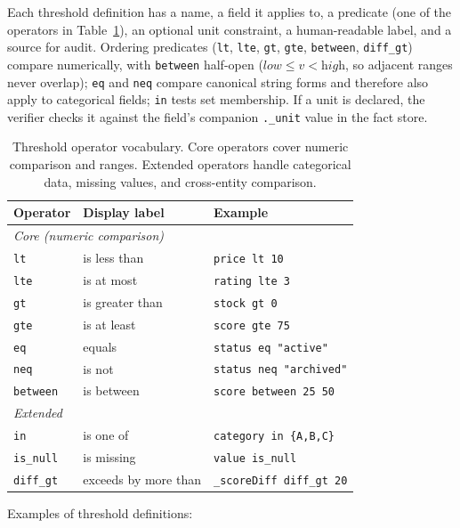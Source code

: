 \documentclass[11pt,a4paper]{article}
\begin{document}
Each threshold definition has a name, a field it applies to, a predicate (one of the operators in Table~\ref{tab:operators}), an optional unit constraint, a human-readable label, and a source for audit. Ordering predicates (\texttt{lt}, \texttt{lte}, \texttt{gt}, \texttt{gte}, \texttt{between}, \texttt{diff\_gt}) compare numerically, with \texttt{between} half-open ($\textit{low} \leq v < \textit{high}$, so adjacent ranges never overlap); \texttt{eq} and \texttt{neq} compare canonical string forms and therefore also apply to categorical fields; \texttt{in} tests set membership. If a unit is declared, the verifier checks it against the field's companion \texttt{.\_unit} value in the fact store.

\begin{table}[h]
\centering
\small
\begin{tabular}{lll}
\toprule
\textbf{Operator} & \textbf{Display label} & \textbf{Example} \\
\midrule
\multicolumn{3}{l}{\textit{Core (numeric comparison)}} \\
\texttt{lt} & is less than & \texttt{price lt 10} \\
\texttt{lte} & is at most & \texttt{rating lte 3} \\
\texttt{gt} & is greater than & \texttt{stock gt 0} \\
\texttt{gte} & is at least & \texttt{score gte 75} \\
\texttt{eq} & equals & \texttt{status eq "active"} \\
\texttt{neq} & is not & \texttt{status neq "archived"} \\
\texttt{between} & is between & \texttt{score between 25 50} \\
\midrule
\multicolumn{3}{l}{\textit{Extended}} \\
\texttt{in} & is one of & \texttt{category in \{A,B,C\}} \\
\texttt{is\_null} & is missing & \texttt{value is\_null} \\
\texttt{diff\_gt} & exceeds by more than & \texttt{\_scoreDiff diff\_gt 20} \\
\bottomrule
\end{tabular}
\caption{Threshold operator vocabulary. Core operators cover numeric comparison and ranges. Extended operators handle categorical data, missing values, and cross-entity comparison.}
\label{tab:operators}
\end{table}

\noindent Examples of threshold definitions:
\end{document}
